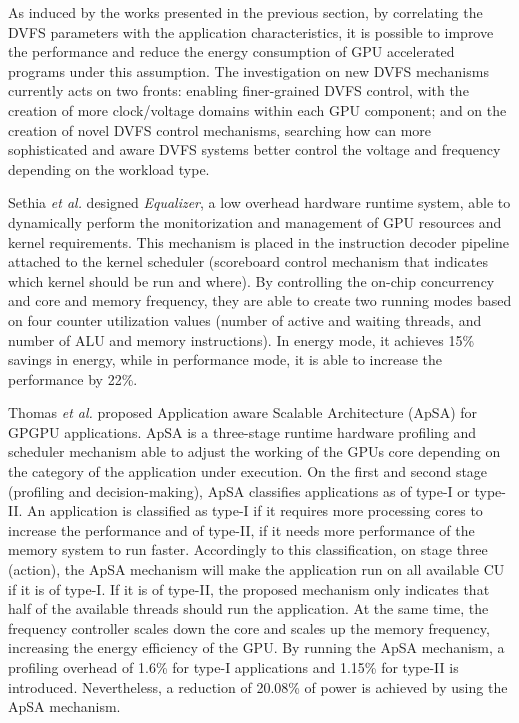 As induced by the works presented in the previous section, by correlating the DVFS parameters with the application characteristics, it is possible to improve the performance and reduce the energy consumption of GPU accelerated programs under this assumption. The investigation on new DVFS mechanisms currently acts on two fronts: enabling finer-grained DVFS control, with the creation of more clock/voltage domains within each GPU component; and on the creation of novel DVFS control mechanisms, searching how can more sophisticated and aware DVFS systems better control the voltage and frequency depending on the workload type.

Sethia \textit{et al.} \cite{sethia_equalizer:_2014} designed \textit{Equalizer}, a low overhead hardware runtime system, able to dynamically perform the monitorization and management of GPU resources and kernel requirements. This mechanism is placed in the instruction decoder pipeline attached to the kernel scheduler (scoreboard control mechanism that indicates which kernel should be run and where). By controlling the on-chip concurrency and core and memory frequency, they are able to create two running modes based on four counter utilization values (number of active and waiting threads, and number of ALU and memory instructions). In energy mode, it achieves 15\% savings in energy, while in performance mode, it is able to increase the performance by 22\%.

Thomas \textit{et al.} \cite{thomas_application_2018} proposed Application aware Scalable Architecture (ApSA) for GPGPU applications. ApSA is a three-stage runtime hardware profiling and scheduler mechanism able to adjust the working of the GPUs core depending on the category of the application under execution. On the first and second stage (profiling and decision-making), ApSA classifies applications as of type-I or type-II. An application is classified as type-I if it requires more processing cores to increase the performance and of type-II, if it needs more performance of the memory system to run faster. Accordingly to this classification, on stage three (action), the ApSA mechanism will make the application run on all available CU if it is of type-I. If it is of type-II, the proposed mechanism only indicates that half of the available threads should run the application. At the same time, the frequency controller scales down the core and scales up the memory frequency, increasing the energy efficiency of the GPU. By running the ApSA mechanism, a profiling overhead of 1.6\% for type-I applications and 1.15\% for type-II is introduced. Nevertheless, a reduction of 20.08\% of power is achieved by using the ApSA mechanism.

